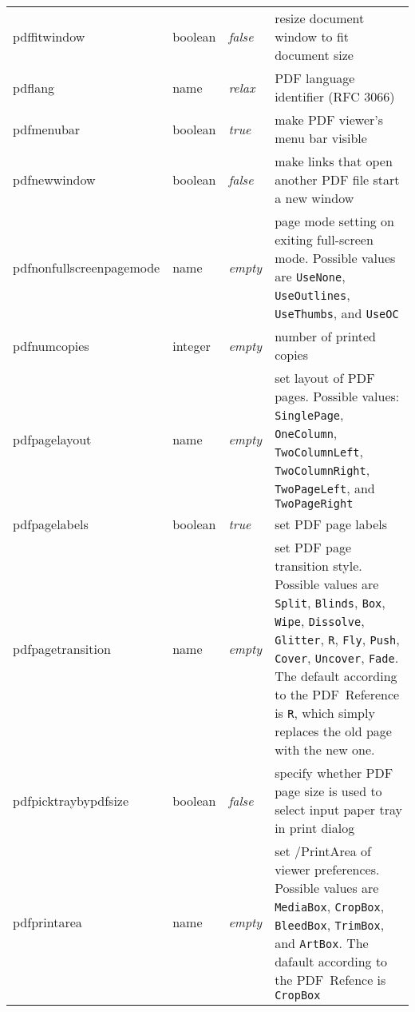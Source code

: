 \documentclass{article}
\begin{document}
\begin{longtable}{@{}>{\ttfamily}l>{\raggedright}p{}>{\itshape}lp{7cm}@{}}
pdffitwindow       & boolean & false & resize document window to fit document size \\
pdflang            & name    & relax & PDF language identifier (RFC 3066)\\
pdfmenubar         & boolean & true  & make PDF viewer's menu bar visible \\
pdfnewwindow       & boolean & false & make links that open another PDF file start a new window \\
pdfnonfullscreenpagemode
                   & name    & empty & page mode setting on exiting full-screen mode. Possible values are
                                       \verb|UseNone|, \verb|UseOutlines|, \verb|UseThumbs|, and \verb|UseOC|\\
pdfnumcopies       & integer & empty & number of printed copies \\
pdfpagelayout      & name    & empty & set layout of PDF pages.  Possible values:
                                       \verb|SinglePage|, \verb|OneColumn|,
                                       \verb|TwoColumnLeft|, \verb|TwoColumnRight|,
                                       \verb|TwoPageLeft|, and \verb|TwoPageRight| \\
pdfpagelabels      & boolean & true  & set PDF page labels \\
pdfpagetransition  & name    & empty & set PDF page transition style. Possible values are
                                       \verb|Split|, \verb|Blinds|, \verb|Box|, \verb|Wipe|,
                                       \verb|Dissolve|, \verb|Glitter|, \verb|R|,
                                       \verb|Fly|, \verb|Push|,
                                       \verb|Cover|, \verb|Uncover|,
                                       \verb|Fade|.
                                       The default according to the PDF~Reference is \verb|R|,
                                       which simply replaces the old page with the new one. \\
pdfpicktraybypdfsize
                   & boolean & false & specify whether PDF page size is used to select input paper tray in print dialog \\
pdfprintarea       & name    & empty & set /PrintArea of viewer preferences.  Possible values are
                                       \verb|MediaBox|, \verb|CropBox|,
                                       \verb|BleedBox|, \verb|TrimBox|, and \verb|ArtBox|.
                                       The dafault according to the PDF~Refence is \verb|CropBox| \\

\end{longtable}
\end{document}
